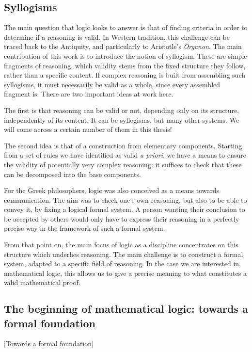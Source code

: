 \subsection{Syllogisms}

The main question that logic looks to answer is that of finding criteria in order to determine
if a reasoning is valid. In Western tradition, this challenge can be traced back to the
Antiquity, and particularly to Aristotle's \textit{Organon}.
The main contribution of this work is to introduce the notion of syllogism.
These are simple fragments of reasoning, which validity stems from the
fixed structure they follow, rather than a specific content.%
If complex reasoning is built from assembling such syllogisms, it must necessarily be valid as
a whole, since every assembled fragment is. There are two important ideas at work here.

The first is that reasoning can be valid or not, depending only on its structure,
independently of its content.
It can be syllogisms, but many other systems. We will come across a certain number of them
in this thesis!

The second idea is that of a construction from elementary components.
Starting from a set of rules
we have identified as valid \textit{a priori}, we have a means to ensure the validity
of potentially very complex reasoning: it suffices to check that these
can be decomposed into the base components.

For the Greek philosophers, logic was also conceived as a means towards communication.
The aim was to check one’s own reasoning, but also to be able to convey
it, by fixing a logical formal system.%
A person wanting their conclusion to be accepted by others would only have to express their
reasoning in a perfectly precise way in the framework of such a formal system.

From that point on, the main focus of logic as a discipline
concentrates on this structure which underlies reasoning.
The main challenge is to construct a formal system, adapted to a specific
field of reasoning. In the case we are interested in, mathematical logic, this
allows us to give a precise meaning to what constitutes a valid mathematical proof.


\subsection{The beginning of mathematical logic: towards a formal foundation}[Towards a formal foundation]

